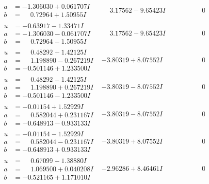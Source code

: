 \documentclass[1p]{elsarticle_modified}
\theoremstyle{definition}
\begin{document}
$$\begin{array}{c|c|c}
\begin{aligned}
a &= -1.306030 + 0.061707 I \\
b &= \phantom{-}0.72964 + 1.50955 I\end{aligned}
 & \phantom{-}3.17562 - 9.65423 I & \phantom{-0.000000 } 0 \\ \hline\begin{aligned}
u &= -0.63917 - 1.33471 I \\
a &= -1.306030 - 0.061707 I \\
b &= \phantom{-}0.72964 - 1.50955 I\end{aligned}
 & \phantom{-}3.17562 + 9.65423 I & \phantom{-0.000000 } 0 \\ \hline\begin{aligned}
u &= \phantom{-}0.48292 + 1.42125 I \\
a &= \phantom{-}1.198890 - 0.267219 I \\
b &= -0.501146 + 1.233500 I\end{aligned}
 & -3.80319 + 8.07552 I & \phantom{-0.000000 } 0 \\ \hline\begin{aligned}
u &= \phantom{-}0.48292 - 1.42125 I \\
a &= \phantom{-}1.198890 + 0.267219 I \\
b &= -0.501146 - 1.233500 I\end{aligned}
 & -3.80319 - 8.07552 I & \phantom{-0.000000 } 0 \\ \hline\begin{aligned}
u &= -0.01154 + 1.52929 I \\
a &= \phantom{-}0.582044 + 0.231167 I \\
b &= -0.648913 - 0.933133 I\end{aligned}
 & -3.80319 - 8.07552 I & \phantom{-0.000000 } 0 \\ \hline\begin{aligned}
u &= -0.01154 - 1.52929 I \\
a &= \phantom{-}0.582044 - 0.231167 I \\
b &= -0.648913 + 0.933133 I\end{aligned}
 & -3.80319 + 8.07552 I & \phantom{-0.000000 } 0 \\ \hline\begin{aligned}
u &= \phantom{-}0.67099 + 1.38880 I \\
a &= \phantom{-}1.069500 + 0.040208 I \\
b &= -0.521165 + 1.171010 I\end{aligned}
 & -2.96286 + 8.46461 I & \phantom{-0.000000 } 0 \\ \hline\begin{aligned}

\end{aligned}
\end{array}$$
\end{document}
